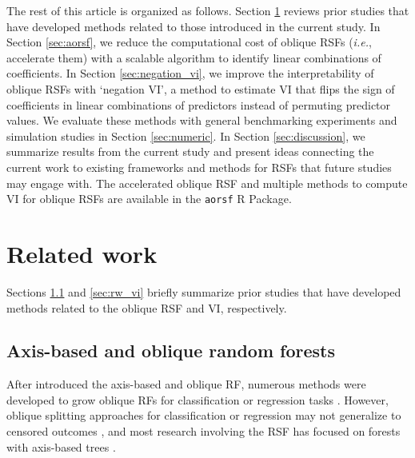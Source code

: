 \documentclass{article}\usepackage[]{graphicx}\usepackage[]{xcolor}
\newcommand{\ie}{\textit{i.e.}}
\newcommand{\eg}{\textit{e.g.}}
\newcommand{\secref}[1]{Section \ref{#1}}
\begin{document}
The rest of this article is organized as follows. \secref{sec:background} reviews prior studies that have developed methods related to those introduced in the current study. In \secref{sec:aorsf}, we reduce the computational cost of oblique RSFs (\ie, accelerate them) with a scalable algorithm to identify linear combinations of coefficients. In \secref{sec:negation_vi}, we improve the interpretability of oblique RSFs with `negation VI', a method to estimate VI that flips the sign of coefficients in linear combinations of predictors instead of permuting predictor values. We evaluate these methods with general benchmarking experiments and simulation studies in \secref{sec:numeric}. In \secref{sec:discussion}, we summarize results from the current study and present ideas connecting the current work to existing frameworks and methods for RSFs that future studies may engage with. The accelerated oblique RSF and multiple methods to compute VI for oblique RSFs are available in the \texttt{aorsf} R Package.






\section{Related work} \label{sec:background}

Sections \ref{sec:rw_forests} and \ref{sec:rw_vi} briefly summarize prior studies that have developed methods related to the oblique RSF and VI, respectively.

\subsection{Axis-based and oblique random forests} \label{sec:rw_forests}

After \citet{breiman2001random} introduced the axis-based and oblique RF, numerous methods were developed to grow oblique RFs for classification or regression tasks \citep{menze2011oblique, zhang2014oblique, rainforth2015canonical, zhu2015reinforcement, poona2016investigating, qiu2017oblique, tomita2020sparse, katuwal2020heterogeneous}. However, oblique splitting approaches for classification or regression may not generalize to censored outcomes \citep[\eg, see][Section~4.5.1]{zhu2013tree}, and most research involving the RSF has focused on forests with axis-based trees \citep{wang2017selective}.
\end{document}
